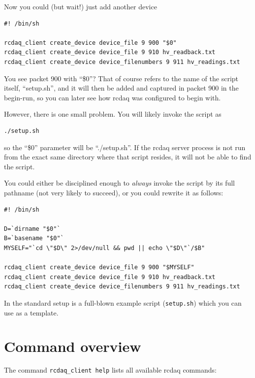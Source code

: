 \documentclass{article}[11pt]
\begin{document}
Now you could (but wait!) just add another device

\begin{verbatim} 
#! /bin/sh

rcdaq_client create_device device_file 9 900 "$0" 
rcdaq_client create_device device_file 9 910 hv_readback.txt 
rcdaq_client create_device device_filenumbers 9 911 hv_readings.txt
\end{verbatim}

You see packet 900 with ``\$0''? That of course refers to the name of
the script itself, ``setup.sh'', and it will then be added and
captured in packet 900 in the begin-run, so you can later see how
rcdaq was configured to begin with.

However, there is one small problem. You will likely invoke the script as 

\begin{verbatim} 
./setup.sh
\end{verbatim}

so the ``\$0'' parameter will be ``./setup.sh''. If the rcdaq server
process is not run from the exact same directory where that script
resides, it will not be able to find the script.

You could either be disciplined enough to \emph{always} invoke the
script by its full pathname (not very likely to succeed), or you could
rewrite it as follows:

\begin{verbatim} 
#! /bin/sh

D=`dirname "$0"`
B=`basename "$0"`
MYSELF="`cd \"$D\" 2>/dev/null && pwd || echo \"$D\"`/$B"

rcdaq_client create_device device_file 9 900 "$MYSELF"
rcdaq_client create_device device_file 9 910 hv_readback.txt 
rcdaq_client create_device device_filenumbers 9 911 hv_readings.txt
\end{verbatim}

In the standard setup is a full-blown example script (\verb|setup.sh|) which you can use
as a template.


\section{Command overview}

The command \verb|rcdaq_client help| lists all available rcdaq commands:
\end{document}
